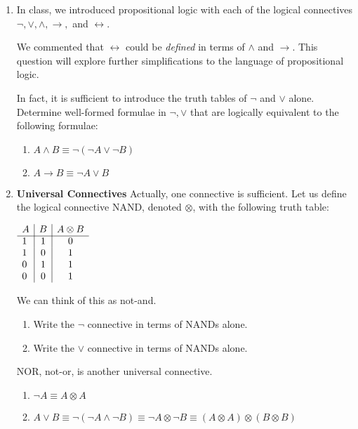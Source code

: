 \documentclass[11pt]{report}
\begin{document}
\begin{enumerate}
	\item In class, we introduced propositional logic with each of the logical connectives $\lnot, \lor, \land, \rightarrow,$ and $\leftrightarrow$. 
	
	\vspace{0.2cm}
	
	We commented that $\leftrightarrow$ could be \emph{defined} in terms of $\land$ and $\rightarrow$. This question will explore further simplifications to the language of propositional logic.

	\vspace{0.2cm}
	
	In fact, it is sufficient to introduce the truth tables of $\lnot$ and $\lor$ alone. Determine well-formed formulae in $\lnot, \lor$ that are logically equivalent to the following formulae: 
	
	\hspace{0.2cm}{\bf Solution}

		\begin{enumerate}
			\item $A \land B \equiv \lnot(\lnot A \lor \lnot B)$
			\item $A \to B \equiv \lnot A \lor B$
		\end{enumerate} 

	
	\item {\bf Universal Connectives} Actually, one connective is sufficient. Let us define the logical connective NAND, denoted $\otimes$, with the following truth table:
	
	\begin{center}
		$\begin{array}{ l | c | c }			
		A & B & A \otimes B\\
		\cline{1 - 3}
		1 & 1 & 0 \\ 
		1 & 0 & 1 \\
		0 & 1 & 1 \\
		0 & 0 & 1 	
		\end{array}$
	\end{center}
	
	We can think of this as not-and.
	
	\begin{enumerate}
		\item Write the $\lnot$ connective in terms of NANDs alone. 
		\item Write the $\lor$ connective in terms of NANDs alone. 		
	\end{enumerate}

	NOR, not-or, is another universal connective. 
				
	\hspace{0.2cm}{\bf Solution}
	\begin{enumerate}
		\item $\lnot A \equiv A \otimes A$
		\item $A \lor B \equiv \lnot (\lnot A \land \lnot B) \equiv \lnot A \otimes \lnot B \equiv (A \otimes A) \otimes (B \otimes B)$
	\end{enumerate}

\end{enumerate}
	
\end{document}
